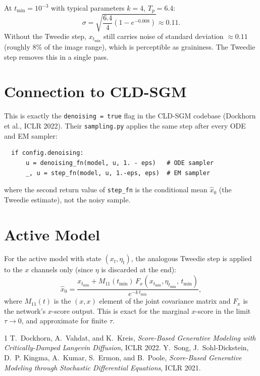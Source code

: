 \documentclass[11pt]{article}
\begin{document}
At $t_{\min} = 10^{-3}$ with typical parameters $k=4$, $T_p = 6.4$:
\[
\sigma = \sqrt{\frac{6.4}{4}(1 - e^{-0.008})} \approx 0.11.
\]
Without the Tweedie step, $x_{t_{\min}}$ still carries noise of standard deviation
$\approx 0.11$ (roughly 8\% of the image range), which is perceptible as graininess.
The Tweedie step removes this in a single pass.

\section{Connection to CLD-SGM}

This is exactly the \texttt{denoising = true} flag in the CLD-SGM codebase
(Dockhorn et al., ICLR 2022).  Their \texttt{sampling.py} applies the same step
after every ODE and EM sampler:
\begin{verbatim}
  if config.denoising:
      u = denoising_fn(model, u, 1. - eps)   # ODE sampler
      _, u = step_fn(model, u, 1.-eps, eps)  # EM sampler
\end{verbatim}
where the second return value of \texttt{step\_fn} is the conditional mean $\hat{x}_0$
(the Tweedie estimate), not the noisy sample.

\section{Active Model}

For the active model with state $(x_t, \eta_t)$, the analogous Tweedie step
is applied to the $x$ channels only (since $\eta$ is discarded at the end):
\begin{equation}
\hat{x}_0 = \frac{x_{t_{\min}} + M_{11}(t_{\min})\,F_x(x_{t_{\min}}, \eta_{t_{\min}},\, t_{\min})}{e^{-k\,t_{\min}}},
\end{equation}
where $M_{11}(t)$ is the $(x,x)$ element of the joint covariance matrix and
$F_x$ is the network's $x$-score output.
This is exact for the marginal $x$-score in the limit $\tau \to 0$,
and approximate for finite $\tau$.

\begin{thebibliography}{1}
T.~Dockhorn, A.~Vahdat, and K.~Kreis,
\textit{Score-Based Generative Modeling with Critically-Damped Langevin Diffusion},
ICLR 2022.
Y.~Song, J.~Sohl-Dickstein, D.~P. Kingma, A.~Kumar, S.~Ermon, and B.~Poole,
\textit{Score-Based Generative Modeling through Stochastic Differential Equations},
ICLR 2021.
\end{thebibliography}
\end{document}
